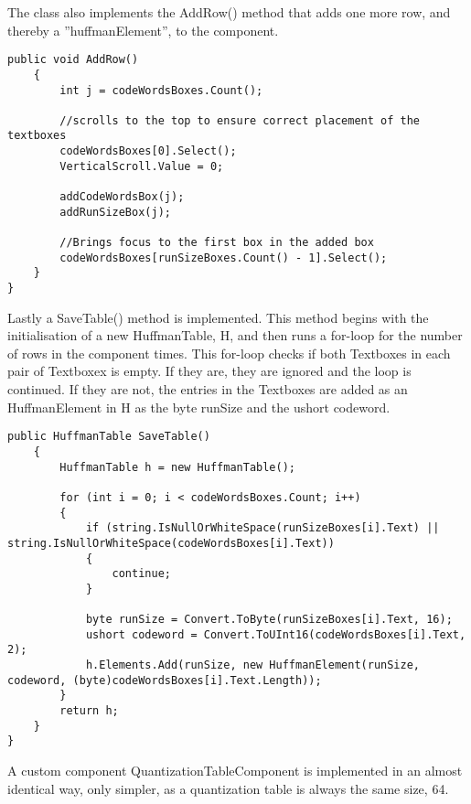 The class also implements the AddRow() method that adds one more row, and thereby a ''huffmanElement'', to the component.


\begin{lstlisting}[firstnumber=136,label=JPEGEncode, caption={\lstinline|JPEGImage.Encode| method \textbf{File: }JPEGImage.cs}]
public void AddRow()
	{
		int j = codeWordsBoxes.Count();
		
		//scrolls to the top to ensure correct placement of the textboxes
		codeWordsBoxes[0].Select();
		VerticalScroll.Value = 0;
		
		addCodeWordsBox(j);
		addRunSizeBox(j);
		
		//Brings focus to the first box in the added box
		codeWordsBoxes[runSizeBoxes.Count() - 1].Select();
	}
}
\end{lstlisting}

Lastly a SaveTable() method is implemented. This method begins with the initialisation of a new HuffmanTable, H, and then runs a for-loop for the number of rows in the component times. This for-loop checks if both Textboxes in each pair of Textboxex is empty. If they are, they are ignored and the loop is continued. If they are not, the entries in the Textboxes are added as an HuffmanElement in H as the byte runSize and the ushort codeword. 

\begin{lstlisting}[firstnumber=136,label=JPEGEncode, caption={\lstinline|JPEGImage.Encode| method \textbf{File: }JPEGImage.cs}]
public HuffmanTable SaveTable()
	{
		HuffmanTable h = new HuffmanTable();
		
		for (int i = 0; i < codeWordsBoxes.Count; i++)
		{
			if (string.IsNullOrWhiteSpace(runSizeBoxes[i].Text) || string.IsNullOrWhiteSpace(codeWordsBoxes[i].Text))
			{
				continue;
			}
			
			byte runSize = Convert.ToByte(runSizeBoxes[i].Text, 16);
			ushort codeword = Convert.ToUInt16(codeWordsBoxes[i].Text, 2);
			h.Elements.Add(runSize, new HuffmanElement(runSize, codeword, (byte)codeWordsBoxes[i].Text.Length));
		}
		return h;
	}
}
\end{lstlisting}

A custom component QuantizationTableComponent is implemented in an almost identical way, only simpler, as a quantization table is always the same size, 64.